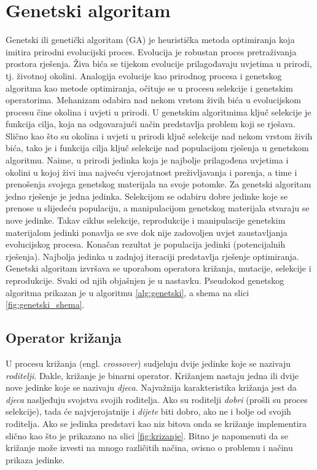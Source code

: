\documentclass[times, utf8, zavrsni, numeric]{fer}
\begin{document}
\section{Genetski algoritam}
\label{sec:genetski}
Genetski ili genetički algoritam (GA)  je heuristička metoda optimiranja koja imitira prirodni evolucijski proces. Evolucija je robustan proces pretraživanja prostora rješenja. Živa bića se tijekom evolucije prilagođavaju uvjetima u prirodi, tj. životnoj okolini. Analogija evolucije kao prirodnog procesa i genetskog algoritma kao metode optimiranja, očituje se u procesu selekcije i genetskim operatorima. Mehanizam odabira nad nekom vrstom živih bića u evolucijskom procesu čine okolina i uvjeti u prirodi. U genetskim algoritmima ključ selekcije je funkcija cilja, koja na odgovarajući način predstavlja problem koji se rješava. Slično kao što su okolina i uvjeti u prirodi ključ selekcije nad nekom vrstom živih bića, tako je i funkcija cilja ključ selekcije nad populacijom rješenja u genetskom algoritmu. Naime, u prirodi jedinka koja je najbolje prilagođena uvjetima i okolini u kojoj živi ima najveću vjerojatnost preživljavanja i parenja, a time i prenošenja svojega genetskog materijala na svoje potomke. Za genetski algoritam jedno rješenje je jedna jedinka. Selekcijom se odabiru dobre jedinke koje se prenose u slijedeću populaciju, a manipulacijom genetskog materijala stvaraju se nove jedinke. Takav ciklus selekcije, reprodukcije i manipulacije genetskim materijalom jedinki ponavlja se sve dok nije zadovoljen uvjet zaustavljanja evolucijskog procesa. Konačan rezultat je populacija jedinki (potencijalnih rješenja). Najbolja jedinka u zadnjoj iteraciji predstavlja rješenje optimiranja. Genetski algoritam izvršava se uporabom operatora križanja, mutacije, selekcije i reprodukcije. Svaki od njih objašnjen je u nastavku. Pseudokod genetskog algoritma prikazan je u algoritmu \ref{alg:genetski}, a shema na slici \ref{fig:genetski_shema}.

\subsection{Operator križanja}
U procesu križanja (engl. \emph{crossover}) sudjeluju dvije jedinke koje se nazivaju \emph{roditelji}. Dakle, križanje je binarni operator. Križanjem nastaju jedna ili dvije nove jedinke koje se nazivaju \emph{djeca}. Najvažnija karakteristika križanja jest da \emph{djeca} nasljeđuju svojstva svojih roditelja. Ako su roditelji \emph{dobri} (prošli su proces selekcije), tada će najvjerojatnije i \emph{dijete} biti dobro, ako ne i bolje od svojih roditelja. Ako se jedinka predstavi kao niz bitova onda se križanje implementira slično kao što je prikazano na slici \ref{fig:krizanje}. Bitno je napomenuti da se križanje može izvesti na mnogo različitih načina, ovisno o problemu i načinu prikaza jedinke.
\end{document}
